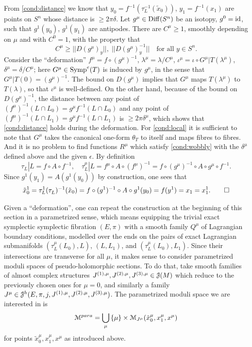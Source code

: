 \documentclass[10pt,letterpaper]{article}
\begin{document}
\proof From \ref{cond:distance} we know that $y_0 =
f^{-1}(\tau_L^{-1}(\tilde{x}_0))$, $y_1 = f^{-1}(x_1)$ are points on $S^n$
whose distance is $\geq 2\pi \delta$. Let $g^\mu \in \mathrm{Diff}(S^n)$ be an isotopy,
$g^0 = \mathrm{id}$, such that $g^1(y_0)$, $g^1(y_1)$ are antipodes. There are $C^\mu
\geq 1$, smoothly depending on $\mu$ and with $C^0 = 1$, with the property that
\[
C^\mu \geq ||D(g^\mu)_y||, \; ||D(g^\mu)^{-1}_y|| \quad \text{for all $y \in
S^n$.}
\]
Consider the ``deformation'' $f^\mu = f \circ (g^\mu)^{-1}$, $\lambda^\mu =
\lambda/C^\mu$, $\iota^\mu = \iota \circ G^\mu | T(\lambda^\mu)$, $\delta^\mu =
\delta/C^\mu$; here $G^\mu \in \mathrm{Symp}^e(T)$ is induced by $g^\mu$, in the sense
that $G^\mu|T(0) = (g^\mu)^{-1}$. The bound on $D(g^\mu)$ implies that $G^\mu$
maps $T(\lambda^\mu)$ to $T(\lambda)$, so that $\iota^\mu$ is well-defined. On
the other hand, because of the bound on $D(g^\mu)^{-1}$, the distance between
any point of $(f^\mu)^{-1}(L \cap L_0) = g^\mu f^{-1}(L \cap L_0)$ and any
point of $(f^\mu)^{-1}(L \cap L_1) = g^\mu f^{-1}(L \cap L_1)$ is $\geq
2\pi\delta^\mu$, which shows that \ref{cond:distance} holds during the
deformation. For \ref{cond:local} it is sufficient to note that $G^\mu$ takes
the canonical one-form $\theta_T$ to itself and maps fibres to fibres. And it
is no problem to find functions $R^\mu$ which satisfy \ref{cond:wobbly} with
the $\delta^\mu$ defined above and the given $\epsilon$. By definition
\[
 \tau_L|L = f \circ A \circ f^{-1}, \quad
 \tau_L^\mu|L = f^\mu \circ A \circ (f^\mu)^{-1}
 = f \circ (g^\mu)^{-1} \circ A \circ g^\mu \circ f^{-1}.
\]
Since $g^1(y_1) = A(g^1(y_0))$ by construction, one sees that
\[
\tilde{x}_0^1 = \tau_L^1 (\tau_L^{})^{-1}(\tilde{x}_0)
 = f \circ (g^1)^{-1} \circ A \circ g^1 (y_0) = f(y^1)
 = x_1 = x_1^1. \qed
\]

Given a ``deformation'', one can repeat the construction at the beginning of
this section in a parametrized sense, which means equipping the trivial exact
symplectic symplectic fibration $(E,\pi)$ with a smooth family $Q^\mu$ of
Lagrangian boundary conditions, modelled over the ends on the pairs of exact
Lagrangian submanifolds $(\tau_L^\mu(L_0),L)$, $(L,L_1)$, and
$(\tau_L^\mu(L_0),L_1)$. Since their intersections are transverse for all
$\mu$, it makes sense to consider parametrized moduli spaces of
pseudo-holomorphic sections. To do that, take smooth families of almost complex
structures $J^{(1),\mu}, J^{(2),\mu}, J^{(3),\mu} \in \mathcal{J}(M)$ which reduce to
the previously chosen ones for $\mu = 0$, and similarly a family $J^\mu \in
\mathcal{J}^h(E,\pi,j,J^{(1),\mu},J^{(2),\mu},J^{(3),\mu})$. The parametrized moduli
space we are interested in is
\[
\mathcal{M}^{para} = \bigcup_{\mu}\, \{\mu\} \times
\mathcal{M}_{J^\mu}(\tilde{x}_0^\mu,x_1^\mu,x^\mu)
\]
for points $\tilde{x}_0^\mu,x_1^\mu,x^\mu$ as introduced above.
\end{document}
